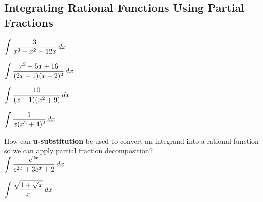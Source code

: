 \documentclass[12pt]{article}
\begin{document}
\newpage

\subsection*{Integrating Rational Functions Using Partial Fractions}

\Example $\displaystyle\int\frac{3}{x^3-x^2-12x}\,dx$

\newpage

\Example $\displaystyle\int\frac{x^2-5x+16}{(2x+1)(x-2)^2}\,dx$

\newpage

\Example $\displaystyle\int\frac{10}{(x-1)(x^2+9)}\,dx$

\newpage

\Example $\displaystyle\int\frac{1}{x(x^2+4)^2}\,dx$

\newpage

How can \textbf{u-substitution} be used to convert an integrand into a rational function so we can apply partial fraction decomposition?\\

\Example $\displaystyle\int\frac{e^{2x}}{e^{2x}+3e^x+2}\,dx$

\vfill

\Example $\displaystyle\int\frac{\sqrt{1+\sqrt{x}}}{x}\,dx$

\vfill
\end{document}
